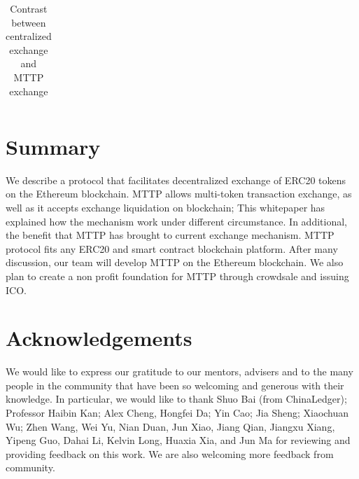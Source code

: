 \documentclass[UTF8,nofonts]{article}
\begin{document}
\begin{table}[hbt]
\begin{tabular}{p{5cm}|p{2.5cm}|p{2.5cm}}
  \end{tabular}

\caption{Contrast between centralized exchange and MTTP exchange} %
\end{table}



\section{Summary\label{sec: summary}}

We describe a protocol that facilitates decentralized exchange of ERC20 tokens on the Ethereum blockchain. MTTP allows multi-token transaction exchange,  as well as it accepts exchange liquidation on blockchain; This whitepaper has explained how the mechanism work under different circumstance. In additional,  the benefit that MTTP has brought to current exchange mechanism.
MTTP protocol fits any ERC20 and smart contract blockchain platform. After many discussion,  our team will develop MTTP on the Ethereum blockchain.
We also plan to create a non profit foundation for MTTP through crowdsale and issuing ICO.

\section{Acknowledgements\label{sec: acknowledgement}}

We would like to express our gratitude to our mentors,  advisers and to the many people in the community that have been so welcoming and generous with their knowledge. In particular,  we would like to thank Shuo Bai (from ChinaLedger); Professor Haibin Kan; Alex Cheng, Hongfei Da; Yin Cao; Jia Sheng; Xiaochuan Wu; Zhen Wang, Wei Yu, Nian Duan, Jun Xiao, Jiang Qian, Jiangxu Xiang, Yipeng Guo, Dahai Li, Kelvin Long, Huaxia Xia, and Jun Ma for reviewing and providing feedback on this work. We are also welcoming more feedback from community.

\newpage  


\end{document}
